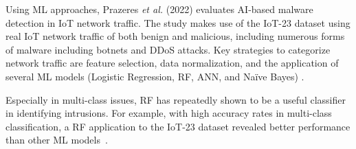 
Using ML approaches, Prazeres \textit{et al.} (2022) evaluates AI-based malware detection in IoT network traffic. The study makes use of the IoT-23 dataset using real IoT network traffic of both benign and malicious, including numerous forms of malware including botnets and DDoS attacks. Key strategies to categorize network traffic are feature selection, data normalization, and the application of several ML models (Logistic Regression, RF, ANN, and Naïve Bayes) \cite{prazeres_evaluation_2022}. 


Especially in multi-class issues, RF has repeatedly shown to be a useful classifier in identifying intrusions. For example, with high accuracy rates in multi-class classification, a RF application to the IoT-23 dataset revealed better performance than other ML models~\cite{malele2023testing}.

